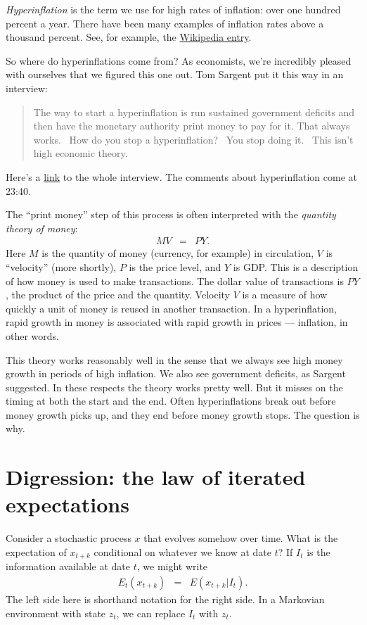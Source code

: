 \documentclass[11pt]{article}
\begin{document}
{\it Hyperinflation\/} is the term we use for high rates of inflation:
over one hundred percent a year.
There have been many examples of inflation rates above a thousand percent.
See, for example, the
\href{http://en.wikipedia.org/wiki/Hyperinflation}{Wikipedia entry}.

So where do hyperinflations come from?
As economists, we're incredibly pleased with ourselves that we figured this one out.
Tom Sargent put it this way in an interview:
\begin{quote}
The way to start a hyperinflation is run sustained government deficits and then have the monetary authority print money to pay for it.  That always works.  How do you stop a hyperinflation?  You stop doing it.  This isn't high economic theory.
\end{quote}
Here's a
\href{http://youtu.be/bVIOClT4Rws}{link}
to the whole interview.
The comments about hyperinflation come at 23:40.

The ``print money'' step of this process is often interpreted with the
{\it quantity theory of money\/}:
\begin{eqnarray*}
    M V &=& P Y .
\end{eqnarray*}
Here $M$ is the quantity of money (currency, for example) in circulation,
$V$ is ``velocity'' (more shortly),
$P$ is the price level, and $Y$ is GDP.
This is a description of how money is used to make transactions.
The dollar value of transactions is $PY$, the product of the price and the quantity.
Velocity $V$ is a measure of how quickly a unit of  money is reused in another transaction.
In a hyperinflation, rapid growth in money is associated
with rapid growth in prices --- inflation, in other words.

This theory works reasonably well in the sense that we always see high money growth in periods
of high inflation.
We also see government deficits, as Sargent suggested.
In these respects the theory works pretty well.
But it misses on the timing at both the start and the end.
Often hyperinflations break out before money growth picks up,
and they end before money growth stops.
The question is why.


\section{Digression:  the law of iterated expectations}

Consider a stochastic process $x$ that evolves somehow over time.
What is the expectation of $x_{t+k}$ conditional on whatever we know at date $t$?
If $I_t$ is the information available at date $t$, we might write
\begin{eqnarray*}
    E_t (x_{t+k}) &=&  E \left( x_{t+k} | I_t \right) .
\end{eqnarray*}
The left side here is shorthand notation for the right side.
In a Markovian environment with state $z_t$, we can replace $I_t$ with $z_t$.
\end{document}
